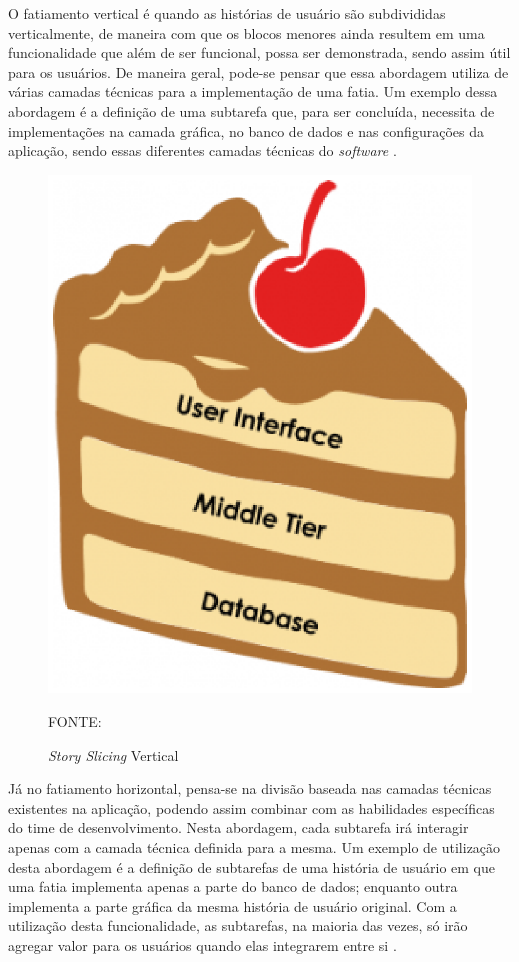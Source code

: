 O fatiamento vertical é quando as histórias de usuário são subdivididas verticalmente,
de maneira com que os blocos menores ainda resultem em uma funcionalidade
que além de ser funcional, possa ser demonstrada, sendo assim útil para os usuários. De
maneira geral, pode-se pensar que essa abordagem utiliza de várias camadas técnicas
para a implementação de uma fatia. Um exemplo dessa abordagem é a definição de uma
subtarefa que, para ser concluída, necessita de implementações na camada gráfica, no
banco de dados e nas configurações da aplicação, sendo essas diferentes camadas técnicas
do \textit{software} \cite{StorySlicing}.

\begin{figure}[h]
	\centering
	\caption{\textit{Story Slicing} Vertical}
	\includegraphics[keepaspectratio=true,scale=0.6]{figuras/storyslicing_vertical.eps}
	\parbox{\linewidth}{\centering FONTE: \cite{StorySlicing}}
	\label{fig_storyslicing}
\end{figure}

Já no fatiamento horizontal, pensa-se na divisão baseada nas camadas técnicas
existentes na aplicação, podendo assim combinar com as habilidades específicas do time
de desenvolvimento. Nesta abordagem, cada subtarefa irá interagir apenas com a camada
técnica definida para a mesma. Um exemplo de utilização desta abordagem é a definição
de subtarefas de uma história de usuário em que uma fatia implementa apenas a parte do
banco de dados; enquanto outra implementa a parte gráfica da mesma história de usuário
original. Com a utilização desta funcionalidade, as subtarefas, na maioria das vezes, só irão
agregar valor para os usuários quando elas integrarem entre si \cite{StorySlicing}.

